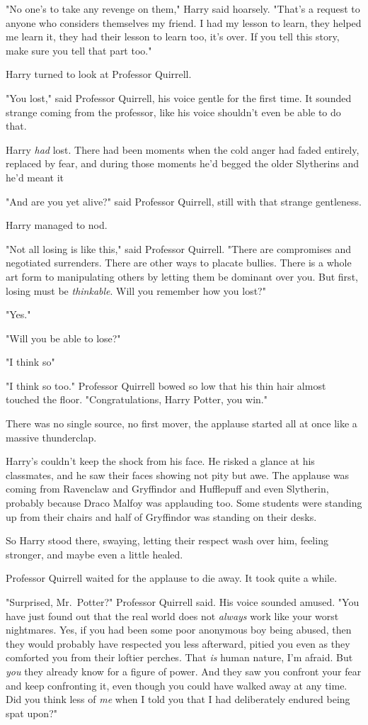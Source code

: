 "No one's to take any revenge on them," Harry said hoarsely. "That's a request
to anyone who considers themselves my friend. I had my lesson to learn, they
helped me learn it, they had their lesson to learn too, it's over. If you tell
this story, make sure you tell that part too."

Harry turned to look at Professor Quirrell.

"You lost," said Professor Quirrell, his voice gentle for the first time. It
sounded strange coming from the professor, like his voice shouldn't even be
able to do that.

Harry \emph{had} lost. There had been moments when the cold anger had faded
entirely, replaced by fear, and during those moments he'd begged the older
Slytherins and he'd meant it{\el}

"And are you yet alive?" said Professor Quirrell, still with that strange
gentleness.

Harry managed to nod.

"Not all losing is like this," said Professor Quirrell. "There are compromises
and negotiated surrenders. There are other ways to placate bullies. There is a
whole art form to manipulating others by letting them be dominant over you. But
first, losing must be \emph{thinkable}. Will you remember how you lost?"

"Yes."

"Will you be able to lose?"

"I{\el} think so{\el}"

"I think so too." Professor Quirrell bowed so low that his thin hair almost
touched the floor. "Congratulations, Harry Potter, you win."

There was no single source, no first mover, the applause started all at once
like a massive thunderclap.

Harry's couldn't keep the shock from his face. He risked a glance at his
classmates, and he saw their faces showing not pity but awe. The applause was
coming from Ravenclaw and Gryffindor and Hufflepuff and even Slytherin,
probably because Draco Malfoy was applauding too. Some students were standing
up from their chairs and half of Gryffindor was standing on their desks.

So Harry stood there, swaying, letting their respect wash over him, feeling
stronger, and maybe even a little healed.

Professor Quirrell waited for the applause to die away. It took quite a while.

"Surprised, Mr.~Potter?" Professor Quirrell said. His voice sounded amused.
"You have just found out that the real world does not \emph{always} work like
your worst nightmares. Yes, if you had been some poor anonymous boy being
abused, then they would probably have respected you less afterward, pitied you
even as they comforted you from their loftier perches. That \emph{is} human
nature, I'm afraid. But \emph{you} they already know for a figure of power. And
they saw you confront your fear and keep confronting it, even though you could
have walked away at any time. Did you think less of \emph{me} when I told you
that I had deliberately endured being spat upon?"

